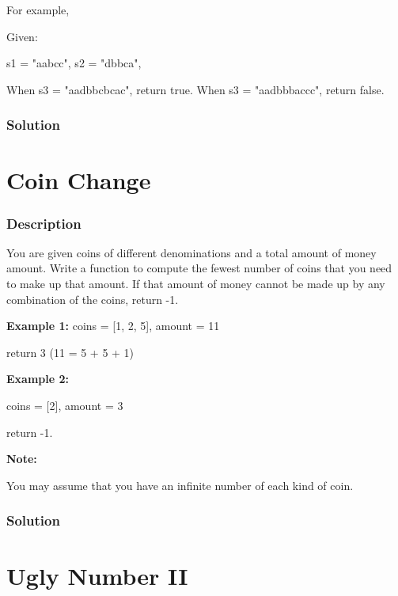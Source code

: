 For example,

Given:
\begin{Code}
s1 = "aabcc",
s2 = "dbbca",

When s3 = "aadbbcbcac", return true.
When s3 = "aadbbbaccc", return false.
\end{Code}
\subsubsection{Solution}

\begin{Code}

\end{Code}

\newpage


\section{Coin Change} %

\subsubsection{Description}
You are given coins of different denominations and a total amount of money amount. Write a function to compute the fewest number of coins that you need to make up that amount. If that amount of money cannot be made up by any combination of the coins, return -1.

\textbf{Example 1:}
coins = [1, 2, 5], amount = 11

return 3 (11 = 5 + 5 + 1)

\textbf{Example 2:}

coins = [2], amount = 3

return -1.

\textbf{Note:}

You may assume that you have an infinite number of each kind of coin.

\subsubsection{Solution}

\begin{Code}

\end{Code}

\newpage

\section{Ugly Number II} %

